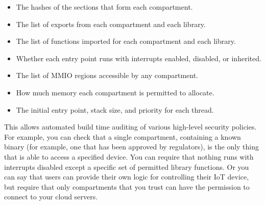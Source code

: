 \begin{itemize}
	\item{The hashes of the sections that form each compartment.}
	\item{The list of exports from each compartment and each library.}
	\item{The list of functions imported for each compartment and each library.}
	\item{Whether each entry point runs with interrupts enabled, disabled, or inherited.}
	\item{The list of MMIO regions accessible by any compartment.}
	\item{How much memory each compartment is permitted to allocate.}
	\item{The initial entry point, stack size, and priority for each thread.}
\end{itemize}

This allows automated build time auditing of various high-level security policies.
For example, you can check that a single compartment, containing a known binary (for example, one that has been approved by regulators), is the only thing that is able to access a specified device.
You can require that nothing runs with interrupts disabled except a specific set of permitted library functions.
Or you can say that users can provide their own logic for controlling their IoT device, but require that only compartments that you trust can have the permission to connect to your cloud servers.

